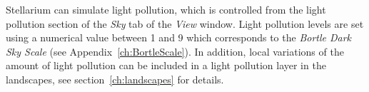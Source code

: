 Stellarium can simulate light pollution, which is controlled from the
light pollution section of the \emph{Sky} tab of the \emph{View}
window.  Light pollution levels are set using a numerical value
between 1 and 9 which corresponds to the \emph{Bortle Dark Sky Scale}
(see Appendix~\ref{ch:BortleScale}).  In addition, local variations of
the amount of light pollution can be included in a light pollution
layer in the landscapes, see
section~\ref{ch:landscapes} for details.


